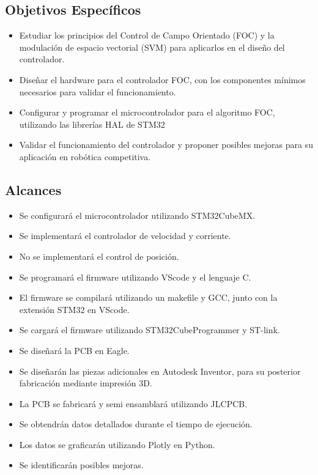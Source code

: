 \documentclass[11pt]{report}
\begin{document}
\subsection{Objetivos Específicos}
\begin{itemize}
	\item Estudiar los principios del Control de Campo Orientado (FOC) y la modulación de espacio vectorial (SVM) para aplicarlos en el diseño del controlador.
	\item Diseñar el hardware para el controlador FOC, con los componentes mínimos necesarios para validar el funcionamiento.
	\item Configurar y programar el microcontrolador para el algoritmo FOC, utilizando las librerías HAL de STM32
	\item Validar el funcionamiento del controlador y proponer posibles mejoras para su aplicación en robótica competitiva.
\end{itemize}

\newpage
\subsection{Alcances}
\begin{itemize}
	\item Se configurará el microcontrolador utilizando STM32CubeMX.
	\item Se implementará el controlador de velocidad y corriente.
	\item No se implementará el control de posición.
	\item Se programará el firmware utilizando VScode y el lenguaje C.
	\item El firmware se compilará utilizando un makefile y GCC, junto con la extensión STM32 en VScode.
	\item Se cargará el firmware utilizando STM32CubeProgrammer y ST-link.
	\item Se diseñará la PCB en Eagle.
	\item Se diseñarán las piezas adicionales en Autodesk Inventor, para su posterior fabricación mediante impresión 3D.
	\item La PCB se fabricará y semi ensamblará utilizando JLCPCB.
	\item Se obtendrán datos detallados durante el tiempo de ejecución.
	\item Los datos se graficarán utilizando Plotly en Python.
	\item Se identificarán posibles mejoras.
\end{itemize}
\end{document}
